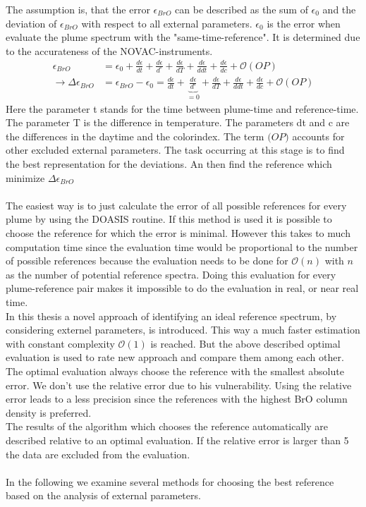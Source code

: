 \documentclass  [
  paper    = a4,
  BCOR     = 10mm,
  twoside,
  fontsize = 12pt,
  fleqn,
  toc      = bibnumbered,
  toc      = listofnumbered,
  numbers  = noendperiod,
  headings = normal,
  listof   = leveldown,
  version  = 3.03
]                                       {scrreprt}
\begin{document}
	The assumption is, that the  error $\epsilon_{BrO}$ can be described as the sum of $\epsilon_{0}$ and the deviation of $\epsilon_{BrO}$ with respect to all external parameters. $\epsilon_{0}$ is the  error when evaluate the plume spectrum with the "same-time-reference". It is determined due to the accurateness of the NOVAC-instruments.
	\begin{align}
		\epsilon_{BrO} &=  \epsilon_{0}+\frac{d\epsilon}{dt}+\frac{d\epsilon}{d ^{\circ}}+\frac{d\epsilon}{dT}+\frac{d\epsilon}{ddt} +\frac{d\epsilon}{dc} + \mathcal{O}\left(OP\right) \\
		\rightarrow \Delta \epsilon_{BrO} &= \epsilon_{BrO} - \epsilon_{0} =\frac{d\epsilon}{dt}+\underbrace{\frac{d\epsilon}{d ^{\circ}}}_{=0}+\frac{d\epsilon}{dT}+\frac{d\epsilon}{ddt} +\frac{d\epsilon}{dc} + \mathcal{O}\left(OP\right) 
		\label{calc:err}
	\end{align}
	Here the parameter t stands for the time between plume-time and reference-time. The parameter T is the difference in temperature. The parameters dt and c are the differences in the daytime and the colorindex. The term $\mathcal(OP)$ accounts for other excluded external parameters.
	The task occurring at this stage is to find the best representation for the deviations. An then find the reference which minimize $\Delta \epsilon_{BrO} $\\
	\\
	The easiest way is to just calculate the  error of all possible references for every plume by using the DOASIS routine. If this method is used it is possible to choose the reference for which the  error is minimal. However this takes to much computation time since the evaluation time would be proportional to the number of possible references because the evaluation needs to be done for $\mathcal{O}(n)$ with $n$ as the number of potential reference spectra. Doing this evaluation for every plume-reference pair makes it impossible to do the evaluation in real, or near real time.\\
	In this thesis a novel approach of identifying an ideal reference spectrum, by considering externel parameters, is introduced. This way a much faster estimation with constant complexity $\mathcal{O}(1)$ is reached.
	But the above described optimal evaluation is used to rate new approach and compare them among each other. The optimal evaluation always choose the reference with the smallest absolute error. We don't use the relative error due to his vulnerability. Using the relative error leads to a less precision since the references with the highest BrO column density is preferred.\\
	The results of the algorithm which chooses the reference automatically are described relative to an optimal evaluation. If the relative error is larger than 5 the data are excluded from the evaluation.\\
	\\
	In the following we examine several methods for choosing the best reference based on the analysis of external parameters. 
	
\end{document}
